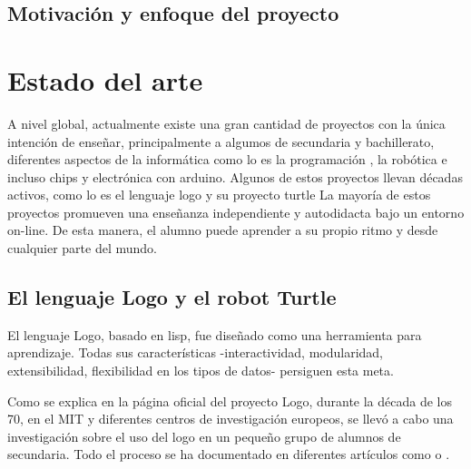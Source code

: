 \section{Motivación y enfoque del proyecto}
\label{sec:motivacion}


\chapter{Estado del arte}\label{estado-arte}



A nivel global, actualmente existe una gran cantidad de proyectos con la única intención de enseñar, principalmente a algumos de secundaria y bachillerato, diferentes aspectos de la informática como lo es la programación \cite{code-school,code-org,code-academy}, la robótica \cite{robomind-web,moway} e incluso chips y electrónica con \Gls{arduino}\cite{arduino}. Algunos de estos proyectos llevan décadas activos, como lo es el lenguaje \Gls{logo}\cite{logo} y su proyecto \Gls{turtle}\cite{logo-turtle}
La mayoría de estos proyectos promueven una enseñanza independiente y autodidacta bajo un entorno on-line. De esta manera, el alumno puede aprender a su propio ritmo y desde cualquier parte del mundo.


\section{El lenguaje Logo y el robot Turtle}
\label{sec:Logo}

El lenguaje Logo, basado en \Gls{lisp}, fue diseñado como una herramienta para aprendizaje. Todas sus características -interactividad, modularidad, extensibilidad, flexibilidad en los tipos de datos- persiguen esta meta.


Como se explica en la página oficial del proyecto Logo\cite{logo}, durante la década de los 70, en el \acrfull{MIT} y diferentes centros de investigación europeos, se llevó a cabo una investigación sobre el uso del \Gls{logo} en un pequeño grupo de alumnos de secundaria. Todo el proceso se ha documentado en diferentes artículos como \cite{feurzeig1969programming} o \cite{pea1984logo}.

